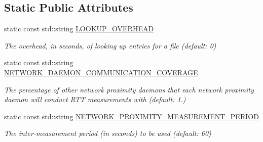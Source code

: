 \subsection*{Static Public Attributes}
\begin{DoxyCompactItemize}
\item 
\mbox{\label{classwrench_1_1_network_proximity_service_property_a180718956b9f9b7bf040cc60dcef65f7}} 
static const std\+::string \hyperlink{classwrench_1_1_network_proximity_service_property_a180718956b9f9b7bf040cc60dcef65f7}{L\+O\+O\+K\+U\+P\+\_\+\+O\+V\+E\+R\+H\+E\+AD}
\begin{DoxyCompactList}\small\item\em The overhead, in seconds, of looking up entries for a file (default\+: 0) \end{DoxyCompactList}\item 
\mbox{\label{classwrench_1_1_network_proximity_service_property_a19af22a3ba877db9832cd764de95d3d8}} 
static const std\+::string \hyperlink{classwrench_1_1_network_proximity_service_property_a19af22a3ba877db9832cd764de95d3d8}{N\+E\+T\+W\+O\+R\+K\+\_\+\+D\+A\+E\+M\+O\+N\+\_\+\+C\+O\+M\+M\+U\+N\+I\+C\+A\+T\+I\+O\+N\+\_\+\+C\+O\+V\+E\+R\+A\+GE}
\begin{DoxyCompactList}\small\item\em The percentage of other network proximity daemons that each network proximity daemon will conduct R\+TT measurements with (default\+: 1.) \end{DoxyCompactList}\item 
\mbox{\label{classwrench_1_1_network_proximity_service_property_ae186f459f35a78e808d406f74483e418}} 
static const std\+::string \hyperlink{classwrench_1_1_network_proximity_service_property_ae186f459f35a78e808d406f74483e418}{N\+E\+T\+W\+O\+R\+K\+\_\+\+P\+R\+O\+X\+I\+M\+I\+T\+Y\+\_\+\+M\+E\+A\+S\+U\+R\+E\+M\+E\+N\+T\+\_\+\+P\+E\+R\+I\+OD}
\begin{DoxyCompactList}\small\item\em The inter-\/measurement period (in seconds) to be used (default\+: 60) \end{DoxyCompactList}\item 
\mbox{\label{classwrench_1_1_network_proximity_service_property_a4a8f7599edf8a3983a0ff5ddfa3c8e2e}} 

\end{DoxyCompactItemize}
